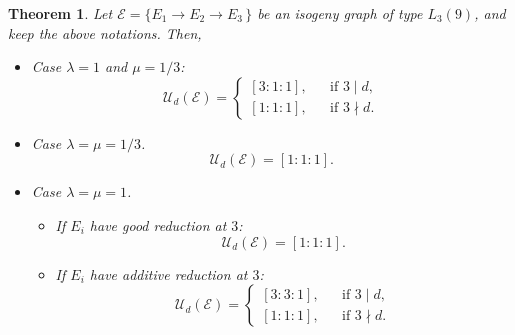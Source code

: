 \documentclass[
  journal=small,
  manuscript=article-type,  %
  year=2020,
  volume=37,
]{cup-journal}
\newtheorem{thm}{Theorem}
\begin{document}
{\color{red}

\begin{thm} Let $\mathcal{E}=\{E_1 \longrightarrow E_2 \longrightarrow E_3\,\}$ be an isogeny graph of type $L_3(9)$,
and keep the above notations. Then, 

\begin{itemize}
    \item[(i)] Case $\lambda=1$ and $\mu=1/3$:
$$    
\mathcal{U}_d(\mathcal E)=
\left\{
\begin{array}{lcl}
[3:1:1], & & \text{if}\,\, 3\mid d,\\[1mm]
[1:1:1], & & \text{if}\,\, 3\nmid d.
\end{array}
\right.
$$

    \item[(ii)] Case $\lambda=\mu=1/3$. 
 $$    
\mathcal{U}_d(\mathcal E)=[1:1:1].
$$

 \item[(iii)] Case $\lambda=\mu=1$. 
 
 \begin{itemize}
    \item[$\bullet$] If $E_i$ have good reduction at $3$:
    $$
    \mathcal{U}_d(\mathcal E)=[1:1:1]. 
    $$
    \item[$\bullet$] If $E_i$ have additive reduction at $3$:
    $$    
\mathcal{U}_d(\mathcal E)=
\left\{
\begin{array}{lcl}
[3:3:1], & & \text{if}\,\, 3\mid d,\\[1mm]
[1:1:1], & & \text{if}\,\, 3\nmid d.  
\end{array}
\right.
$$
\end{itemize}



 
\end{itemize}
\end{thm}
}
\end{document}

